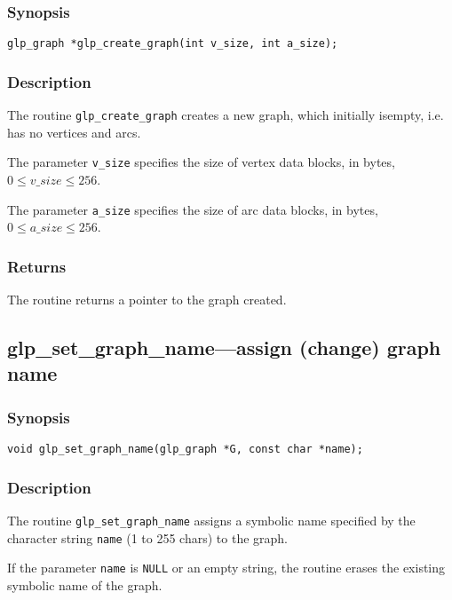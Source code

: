 \documentclass[dvipdfm,11pt]{report}
\begin{document}
\subsubsection*{Synopsis}

\begin{verbatim}
glp_graph *glp_create_graph(int v_size, int a_size);
\end{verbatim}

\subsubsection*{Description}

The routine \verb|glp_create_graph| creates a new graph, which
initially is\linebreak empty, i.e. has no vertices and arcs.

The parameter \verb|v_size| specifies the size of vertex data blocks,
in bytes, $0\leq v\_size\leq 256$.

The parameter \verb|a_size| specifies the size of arc data blocks, in
bytes, $0\leq a\_size\leq 256$.

\subsubsection*{Returns}

The routine returns a pointer to the graph created.

\subsection{glp\_set\_graph\_name---assign (change) graph name}

\subsubsection*{Synopsis}

\begin{verbatim}
void glp_set_graph_name(glp_graph *G, const char *name);
\end{verbatim}

\subsubsection*{Description}

The routine \verb|glp_set_graph_name| assigns a symbolic name specified
by the character string \verb|name| (1 to 255 chars) to the graph.

If the parameter \verb|name| is \verb|NULL| or an empty string, the
routine erases the existing symbolic name of the graph.
\end{document}
